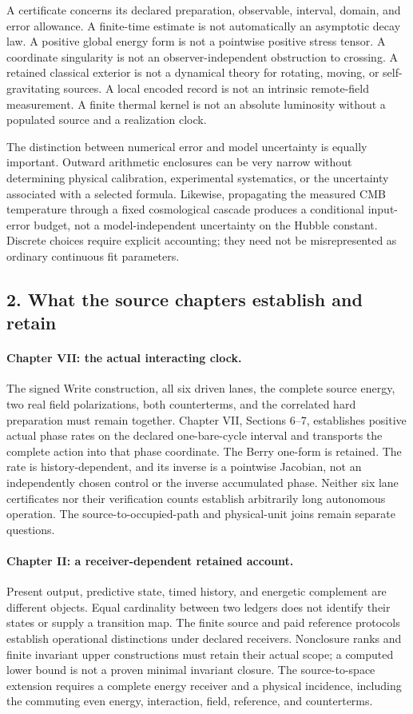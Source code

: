 A certificate concerns its declared preparation, observable, interval, domain, and error allowance. A finite-time estimate is not automatically an asymptotic decay law. A positive global energy form is not a pointwise positive stress tensor. A coordinate singularity is not an observer-independent obstruction to crossing. A retained classical exterior is not a dynamical theory for rotating, moving, or self-gravitating sources. A local encoded record is not an intrinsic remote-field measurement. A finite thermal kernel is not an absolute luminosity without a populated source and a realization clock.

The distinction between numerical error and model uncertainty is equally important. Outward arithmetic enclosures can be very narrow without determining physical calibration, experimental systematics, or the uncertainty associated with a selected formula. Likewise, propagating the measured CMB temperature through a fixed cosmological cascade produces a conditional input-error budget, not a model-independent uncertainty on the Hubble constant. Discrete choices require explicit accounting; they need not be misrepresented as ordinary continuous fit parameters.

\subsection*{2. What the source chapters establish and retain}

\paragraph{Chapter VII: the actual interacting clock.}
The signed Write construction, all six driven lanes, the complete source energy, two real field polarizations, both counterterms, and the correlated hard preparation must remain together. Chapter VII, Sections 6--7, establishes positive actual phase rates on the declared one-bare-cycle interval and transports the complete action into that phase coordinate. The Berry one-form is retained. The rate is history-dependent, and its inverse is a pointwise Jacobian, not an independently chosen control or the inverse accumulated phase. Neither six lane certificates nor their verification counts establish arbitrarily long autonomous operation. The source-to-occupied-path and physical-unit joins remain separate questions.

\paragraph{Chapter II: a receiver-dependent retained account.}
Present output, predictive state, timed history, and energetic complement are different objects. Equal cardinality between two ledgers does not identify their states or supply a transition map. The finite source and paid reference protocols establish operational distinctions under declared receivers. Nonclosure ranks and finite invariant upper constructions must retain their actual scope; a computed lower bound is not a proven minimal invariant closure. The source-to-space extension requires a complete energy receiver and a physical incidence, including the commuting even energy, interaction, field, reference, and counterterms.

